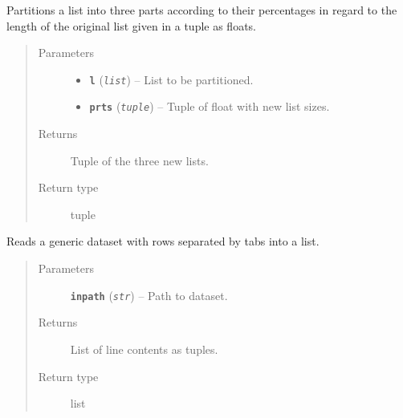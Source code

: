 \documentclass[letterpaper,10pt,english]{sphinxmanual}
\begin{document}

\begin{fulllineitems}
\label{src.misc:src.misc.helpers.partitions_list}
Partitions a list into three parts according to their percentages in regard to the length of the original list given
in a tuple as floats.
\begin{quote}\begin{description}
\item[{Parameters}] \leavevmode\begin{itemize}
\item {} 
\textbf{\texttt{l}} (\emph{\texttt{list}}) -- List to be partitioned.

\item {} 
\textbf{\texttt{prts}} (\emph{\texttt{tuple}}) -- Tuple of float with new list sizes.

\end{itemize}

\item[{Returns}] \leavevmode
Tuple of the three new lists.

\item[{Return type}] \leavevmode
tuple

\end{description}\end{quote}

\end{fulllineitems}


\begin{fulllineitems}
\label{src.misc:src.misc.helpers.read_dataset}
Reads a generic dataset with rows separated by tabs into a list.
\begin{quote}\begin{description}
\item[{Parameters}] \leavevmode
\textbf{\texttt{inpath}} (\emph{\texttt{str}}) -- Path to dataset.

\item[{Returns}] \leavevmode
List of line contents as tuples.

\item[{Return type}] \leavevmode
list

\end{description}\end{quote}

\end{fulllineitems}
\end{document}
